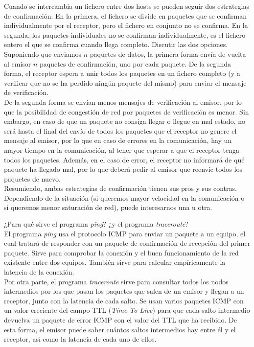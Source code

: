 \begin{ejercicio}
    Cuando se intercambia un fichero entre dos hosts se pueden seguir dos estrategias de confirmación. En la primera, el fichero se divide en paquetes que se confirman individualmente por el receptor, pero el fichero en conjunto no se confirma. En la segunda, los paquetes individuales no se confirman individualmente, es el fichero entero el que se confirma cuando llega completo. Discutir las dos opciones.\\

    Suponiendo que enviamos $n$ paquetes de datos, la primera forma envía de vuelta al emisor $n$ paquetes de confirmación, uno por cada paquete. De la segunda forma, el receptor espera a unir todos los paquetes en un fichero completo (y a verificar que no se ha perdido ningún paquete del mismo) para enviar el mensaje de verificación.\\

    De la segunda forma se envían menos mensajes de verificación al emisor, por lo que la posibilidad de congestión de red por paquetes de verificación es menor. Sin embargo, en caso de que un paquete no consiga llegar o llegue en mal estado, no será hasta el final del envío de todos los paquetes que el receptor no genere el mensaje al emisor, por lo que en caso de errores en la comunicación, hay un mayor tiempo en la comunicación, al tener que esperar a que el receptor tenga todos los paquetes. Además, en el caso de error,
    el receptor no informará de qué paquete ha llegado mal, por lo que deberá pedir al emisor que reenvíe todos los paquetes de nuevo.\\

    Resumiendo, ambas estrategias de confirmación tienen sus pros y sus contras. Dependiendo de la situación (si queremos mayor velocidad en la comunicación o si queremos menor saturación de red), puede interesarnos una u otra.
\end{ejercicio}

\begin{ejercicio}
   ¿Para qué sirve el programa \textit{ping}? ¿y el programa \textit{traceroute}? \\

   El programa \textit{ping} usa el protocolo ICMP para enviar un paquete a un equipo, el cual tratará de responder con un paquete de confirmación de recepción del primer paquete. Sirve para comprobar la conexión y el buen funcionamiento de la red existente entre dos equipos. También sirve para calcular empíricamente la latencia de la conexión.\\

   Por otra parte, el programa \textit{traceroute} sirve para consultar todos los nodos intermedios por los que pasan los paquetes que salen de un emisor y llegan a un receptor, junto con la latencia de cada salto. Se usan varios paquetes ICMP con un valor creciente del campo TTL (\textit{Time To Live}) para que cada salto intermedio devuelva un paquete de error ICMP con el valor del TTL que ha recibido. De esta forma, el emisor puede saber cuántos saltos intermedios hay entre él y el receptor, así como la latencia de cada uno de ellos.
\end{ejercicio}

